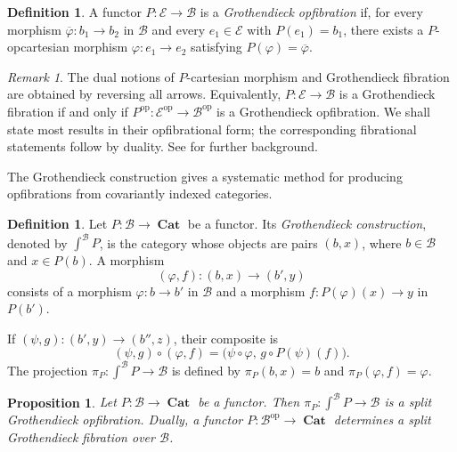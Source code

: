 \documentclass[12pt]{amsart}
\newtheorem{prop}[teo]{Proposition}
\theoremstyle{definition}
\newtheorem{definition}[teo]{Definition}
\theoremstyle{remark}
\newtheorem{remark}{Remark}
\numberwithin{figure}{section}%
\newcommand{\Ba}{\mathcal{B}}
\newcommand{\cat}{\mathop{\mathbf{Cat}}}
\newcommand{\E}{\mathcal{E}}
\newcommand{\op}{\mathrm{op}}
\begin{document}
\begin{definition}
A functor \(P\colon\E\to\Ba\) is a \emph{Grothendieck opfibration} if,
for every morphism \(\overline{\varphi}\colon b_1\to b_2\) in \(\Ba\)
and every \(e_1\in\E\) with \(P(e_1)=b_1\), there exists a
\(P\)-opcartesian morphism \(\varphi\colon e_1\to e_2\) satisfying
\(P(\varphi)=\overline{\varphi}\).
\end{definition}

\begin{remark}
The dual notions of \(P\)-cartesian morphism and Grothendieck fibration
are obtained by reversing all arrows. Equivalently,
\(P\colon\E\to\Ba\) is a Grothendieck fibration if and only if
\(P^{\op}\colon\E^{\op}\to\Ba^{\op}\) is a Grothendieck opfibration.
We shall state most results in their opfibrational form; the corresponding
fibrational statements follow by duality. See
\cite{RosoliniGrothendieckFibrations,GrothendieckRevetements,RiehlLoregianFibration,Varadarajan} for further background.
\end{remark}

The Grothendieck construction gives a systematic method for producing
opfibrations from covariantly indexed categories.

\begin{definition}
Let \(P\colon\Ba\to\cat\) be a functor. Its \emph{Grothendieck
construction}, denoted by \(\int^\Ba P\), is the category whose objects are
pairs \((b,x)\), where \(b\in\Ba\) and \(x\in P(b)\). A morphism
\[
(\varphi,f)\colon(b,x)\longrightarrow(b',y)
\]
consists of a morphism \(\varphi\colon b\to b'\) in \(\Ba\) and a
morphism \(f\colon P(\varphi)(x)\to y\) in \(P(b')\).

If
\((\psi,g)\colon(b',y)\to(b'',z)\), their composite is
\[
(\psi,g)\circ(\varphi,f)
=
\bigl(\psi\circ\varphi,\,
g\circ P(\psi)(f)\bigr).
\]
The projection
\(\pi_P\colon\int^\Ba P\to\Ba\) is defined by
\(\pi_P(b,x)=b\) and \(\pi_P(\varphi,f)=\varphi\).
\end{definition}

\begin{prop}\label{prop:GrothendiecktConstruction_to_Opfibration}
Let \(P\colon\Ba\to\cat\) be a functor. Then
\(\pi_P\colon\int^\Ba P\to\Ba\) is a split Grothendieck opfibration.
Dually, a functor \(P\colon\Ba^{\op}\to\cat\) determines a split
Grothendieck fibration over \(\Ba\).
\end{prop}
\end{document}
